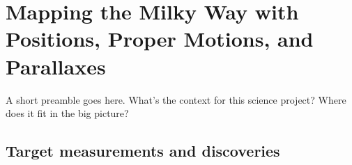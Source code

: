 %
%
%
%
%
%
%

\section{Mapping the Milky Way with Positions, Proper Motions, and Parallaxes}
\def\secname{MW_Astrometry}\label{sec:\secname} %



A short preamble goes here. What's the context for this science
project? Where does it fit in the big picture?


\subsection{Target measurements and discoveries}
\label{sec:keyword:MW_Astrometry_targets}

